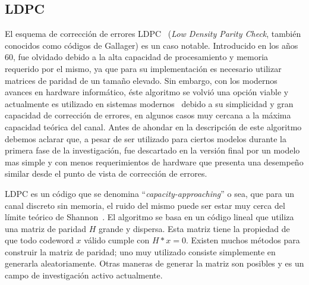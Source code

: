 \subsection{LDPC}
El esquema de corrección de errores LDPC~\cite{gallagerpress} (\textit{Low Density Parity Check}, también conocidos como códigos de Gallager) es un caso notable. Introducido en los años 60, fue olvidado debido a la alta capacidad de procesamiento y memoria requerido por el mismo, ya que para su implementación es necesario utilizar matrices de paridad de un tamaño elevado. Sin embargo, con los modernos avances en hardware informático, éste algoritmo se volvió una opción viable y actualmente es utilizado en sistemas modernos~\cite{brack2007low} debido a su simplicidad y gran capacidad de corrección de errores, en algunos casos muy cercana a la máxima capacidad teórica del canal.
Antes de ahondar en la descripción de este algoritmo debemos aclarar que, a pesar de ser utilizado para ciertos modelos durante la primera fase de la investigación, fue descartado en la versión final por un modelo mas simple y con menos requerimientos de hardware que presenta una desempeño similar desde el punto de vista de corrección de errores.

LDPC es un código que se denomina ``\textit{capacity-approaching}'' o sea, que para un canal discreto sin memoria, el ruido del mismo puede ser estar muy cerca del límite teórico de Shannon~\cite{shannon48}.
El algoritmo se basa en un código lineal que utiliza una matriz de paridad $H$ grande y dispersa. Esta matriz tiene la propiedad de que todo codeword $x$ válido cumple con $H*x=0$. 
Existen muchos métodos para construir la matriz de paridad; uno muy utilizado consiste simplemente en generarla aleatoriamente. Otras maneras de generar la matriz son posibles y es un campo de investigación activo actualmente.



